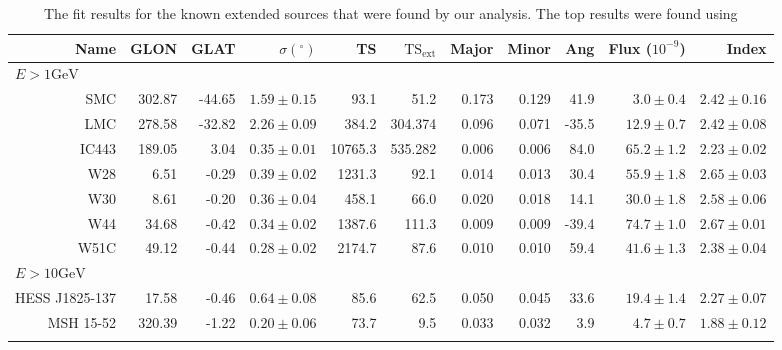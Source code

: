 \documentclass[preprint]{aastex}
\newcommand{\gev}{\text{GeV}}
\begin{document}
\clearpage
\begin{table}
    \begin{centering}
      \begin{tabular}{rrrrrrrrrrr}
        Name           &    GLON &    GLAT & $\sigma(^\circ)$ &      TS & $\text{TS}_\text{ext}$ & Major & Minor &   Ang & Flux ($10^{-9}$) &         Index \\
        \hline
        \multicolumn{11}{l}{$E > 1\gev$} \\
        \hline
        SMC            & 302.87  &  -44.65 &    $1.59\pm0.15$ &    93.1 &                   51.2 & 0.173 & 0.129 &  41.9 &   $3.0\pm0.4$    & $2.42\pm0.16$ \\
        LMC            & 278.58  &  -32.82 &    $2.26\pm0.09$ &   384.2 &                304.374 & 0.096 & 0.071 & -35.5 &  $12.9\pm0.7$    & $2.42\pm0.08$ \\
        IC443          & 189.05  &  3.04   &    $0.35\pm0.01$ & 10765.3 &                535.282 & 0.006 & 0.006 &  84.0 &  $65.2\pm1.2$    & $2.23\pm0.02$ \\
        W28            & 6.51    &  -0.29  &    $0.39\pm0.02$ &  1231.3 &                   92.1 & 0.014 & 0.013 &  30.4 &  $55.9\pm1.8$    & $2.65\pm0.03$ \\
        W30            & 8.61    &  -0.20  &    $0.36\pm0.04$ &   458.1 &                  66.0  & 0.020 & 0.018 &  14.1 &  $30.0\pm1.8$    & $2.58\pm0.06$ \\
        W44            & 34.68   &  -0.42  &    $0.34\pm0.02$ &  1387.6 &                  111.3 & 0.009 & 0.009 & -39.4 &  $74.7\pm1.0$    & $2.67\pm0.01$ \\
        W51C           & 49.12   &  -0.44  &    $0.28\pm0.02$ &  2174.7 &                   87.6 & 0.010 & 0.010 &  59.4 &  $41.6\pm1.3$    & $2.38\pm0.04$ \\
        \hline
        \multicolumn{11}{l}{$E > 10\gev$} \\
        \hline
        HESS J1825-137 &   17.58 &   -0.46 &    $0.64\pm0.08$ &    85.6 &                   62.5 & 0.050 & 0.045 & 33.6  &     $19.4\pm1.4$ & $2.27\pm0.07$ \\
        MSH 15-52      &  320.39 &   -1.22 &    $0.20\pm0.06$ &    73.7 &                    9.5 & 0.033 & 0.032 & 3.9   &      $4.7\pm0.7$ & $1.88\pm0.12$ \\
      \label{known_extended_sources}
      \end{tabular}
      \caption{The fit results for the known extended sources that
      were found by our analysis. The top results were found using
}
\end{centering}
\end{table}
\end{document}

